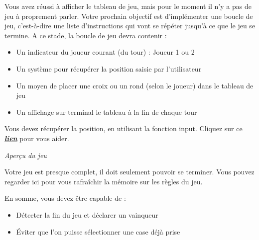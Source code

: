 \documentclass[a4paper]{article}
\begin{document}
\vspace*{1cm}
\setlength{\parindent}{3ex}Vous avez réussi à afficher le tableau de jeu, mais pour le moment il n’y a pas de jeu à proprement parler. Votre prochain objectif est d’implémenter une boucle de jeu, c’est-à-dire une liste d’instructions qui vont se répéter jusqu’à ce que le jeu se termine.
A ce stade, la boucle de jeu devra contenir :
\begin{itemize}[label=\textbullet,font=\color{black}] 
\item Un indicateur du joueur courant (du tour) : Joueur 1 ou 2

\item Un système pour récupérer la position saisie par l’utilisateur

\item Un moyen de placer une croix ou un rond (selon le joueur) dans le tableau de jeu

\item Un affichage sur terminal le tableau à la fin de chaque tour
\end{itemize}
Vous devez récupérer la position, en utilisant la fonction input. Cliquez sur ce \href{https://www.w3schools.com/python/ref_func_input.asp}{\textbf{\textit{lien}}} pour vous aider.

\vspace*{1cm}

\begin {center}
\textit{Aperçu du jeu}
\end {center}


\vspace*{1cm}

\newpage

\setlength{\parindent}{10ex}

\vspace*{1cm}

\setlength{\parindent}{3ex}Votre jeu est presque complet, il doit seulement pouvoir se terminer. Vous pouvez regarder ici pour vous rafraîchir la mémoire sur les règles du jeu.

En somme, vous devez être capable de :
\begin{itemize}[label=\textbullet,font=\color{black}] 
\item Détecter la fin du jeu et déclarer un vainqueur

\item Éviter que l’on puisse sélectionner une case déjà prise
\end{itemize}
\end{document}
